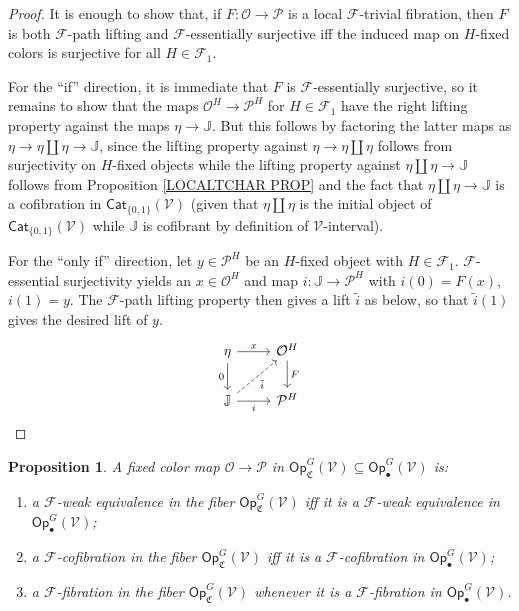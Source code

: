 \documentclass[a4paper,10pt
 ,final
]{article}%
\numberwithin{equation}{section}
\numberwithin{figure}{section}
\newtheorem{proposition}[equation]{Proposition}%
\theoremstyle{definition} %
\newcommand{\Op}{\mathsf{Op}}%
\newcommand{\F}{\ensuremath{\mathcal F}}
\newcommand{\V}{\ensuremath{\mathcal V}}
\renewcommand{\O}{\ensuremath{\mathcal O}}
\renewcommand{\P}{\ensuremath{\mathcal P}}
\newcommand{\1}{\ensuremath{\mathbbm 1}}%
\begin{document}
\begin{proof}
It is enough to show that,
if $F \colon \O \to \P$ is a local $\F$-trivial fibration,
then $F$ is both $\F$-path lifting and $\F$-essentially surjective
iff  the induced map on $H$-fixed colors is surjective for all $H \in \F_1$.


For the ``if'' direction, it is immediate that $F$ is
$\F$-essentially surjective, so it remains to show that
the maps $\O^H\to \P^H$ for $H \in \F_1$
have the right lifting property against the maps
$\eta \to \mathbb{J}$.
But this follows by factoring the latter maps as
$\eta \to \eta \amalg \eta \to \mathbb{J}$, 
since the lifting property against 
$\eta \to \eta \amalg \eta$ follows from surjectivity on $H$-fixed objects while the lifting property against
$\eta \amalg \eta \to \mathbb{J}$
follows from Proposition \ref{LOCALTCHAR PROP}
and the fact that 
$\eta \amalg \eta \to \mathbb{J}$
is a cofibration in $\mathsf{Cat}_{\{0,1\}}(\V)$
(given that $\eta \amalg \eta$ is the initial object of $\mathsf{Cat}_{\{0,1\}}(\V)$
while $\mathbb{J}$ is cofibrant by definition of $\V$-interval).

For the ``only if'' direction, let $y \in \P^H$ be an $H$-fixed object with $H \in \F_1$.
$\F$-essential surjectivity yields an $x \in \O^H$ and map 
$i \colon \mathbb{J} \to \P^H$
with $i(0)=F(x)$, $i(1)=y$.
The $\F$-path lifting property then gives a lift $\tilde{i}$ as below, 
so that $\tilde{i}(1)$ gives the desired lift of $y$.
\[
\begin{tikzcd}
	\eta \ar{d}[swap]{0} \ar{r}{x}  
&
	\O^H \arrow{d}{F}
\\
	\mathbb{J} \ar{r}[swap]{i} \ar[dashed]{ru}[swap]{\tilde{i}}
&
	\P^H
\end{tikzcd}
\]   
\end{proof}



\begin{proposition}\label{FIBERGLMOD PROP}
A fixed color map
$\O \to \P$ in
$\mathsf{Op}^G_{\mathfrak{C}}(\V) \subseteq \Op^G_\bullet(\V)$ is:
\begin{enumerate}[label=(\roman*)]
\item a $\F$-weak equivalence in the fiber
$\mathsf{Op}_{\mathfrak{C}}^G(\V)$
iff it is a $\F$-weak equivalence in
$\mathsf{Op}_{\bullet}^G(\V)$;
\item a $\F$-cofibration in the fiber 
$\mathsf{Op}_{\mathfrak{C}}^G(\V)$
iff it is a $\F$-cofibration in
$\mathsf{Op}_{\bullet}^G(\V)$;
\item a $\F$-fibration in the fiber 
$\mathsf{Op}_{\mathfrak{C}}^G(\V)$
whenever it is a $\F$-fibration in
$\mathsf{Op}_{\bullet}^G(\V)$.
\end{enumerate}
\end{proposition}
\end{document}
